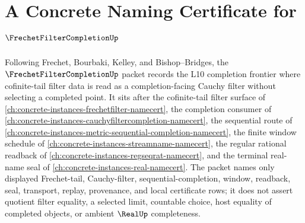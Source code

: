 \chapter{A Concrete Naming Certificate for $\FrechetFilterCompletionUp$}
\label{ch:concrete-instances-frechet-filter-completion-namecert}

Following Frechet, Bourbaki, Kelley, and Bishop--Bridges, the $\FrechetFilterCompletionUp$ packet records the L10 completion frontier where cofinite-tail filter data is read as a completion-facing Cauchy filter without selecting a completed point. It sits after the cofinite-tail filter surface of \autoref{ch:concrete-instances-frechetfilter-namecert}, the completion consumer of \autoref{ch:concrete-instances-cauchyfiltercompletion-namecert}, the sequential route of \autoref{ch:concrete-instances-metric-sequential-completion-namecert}, the finite window schedule of \autoref{ch:concrete-instances-streamname-namecert}, the regular rational readback of \autoref{ch:concrete-instances-regseqrat-namecert}, and the terminal real-name seal of \autoref{ch:concrete-instances-real-namecert}. The packet names only displayed Frechet-tail, Cauchy-filter, sequential-completion, window, readback, seal, transport, replay, provenance, and local certificate rows; it does not assert quotient filter equality, a selected limit, countable choice, host equality of completed objects, or ambient $\RealUp$ completeness.

